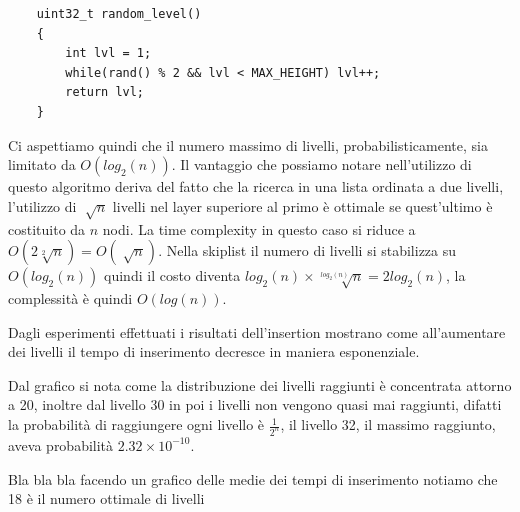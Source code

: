\documentclass[letterpaper]{report}
\begin{document}
\begin{lstlisting}
    uint32_t random_level()
    {
        int lvl = 1;
        while(rand() % 2 && lvl < MAX_HEIGHT) lvl++;
        return lvl;
    }
\end{lstlisting}
Ci aspettiamo quindi che il numero massimo di livelli, probabilisticamente, sia limitato da $O(log_{2}(n))$.
Il vantaggio che possiamo notare nell'utilizzo di questo algoritmo deriva del fatto che
la ricerca in una lista ordinata a due livelli, l'utilizzo di $\sqrt[]{n}$ livelli nel layer superiore
al primo è ottimale se quest'ultimo è costituito da $n$ nodi. La time complexity in questo caso
si riduce a $O(2\sqrt[2]{n}) = O(\sqrt[]{n})$.
Nella skiplist il numero di livelli si stabilizza su $O(log_{2}(n))$ quindi il costo 
diventa $log_{2}(n) \times \sqrt[log_{2}(n)]{n} = 2log_{2}(n)$, la complessità è 
quindi $O(log(n))$.

\clearpage
Dagli esperimenti effettuati i risultati dell'insertion mostrano come all'aumentare 
dei livelli il tempo di inserimento decresce in maniera esponenziale.
\begin{figure}[H]
\centering
    
\end{figure}

Dal grafico si nota come la distribuzione dei livelli raggiunti è concentrata 
attorno a 20, inoltre dal livello 30 in poi i livelli non vengono quasi mai raggiunti, 
difatti la probabilità di raggiungere ogni livello è $\frac{1}{2^n}$, il livello
32, il massimo raggiunto, aveva probabilità $2.32 \times 10^{-10}$.
\begin{figure}[H]
\centering
    
\end{figure}

Bla bla bla facendo un grafico delle medie dei tempi di inserimento notiamo che 18
è il numero ottimale di livelli
\begin{figure}[H]
\centering
    
\end{figure}
\end{document}
